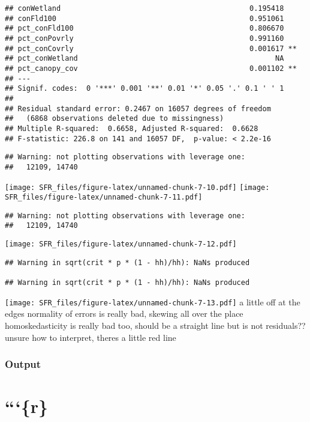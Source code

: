 \documentclass[]{article}
\begin{document}
\begin{verbatim}
## conWetland                                            0.195418    
## conFld100                                             0.951061    
## pct_conFld100                                         0.806670    
## pct_conPovrly                                         0.991160    
## pct_conCovrly                                         0.001617 ** 
## pct_conWetland                                              NA    
## pct_canopy_cov                                        0.001102 ** 
## ---
## Signif. codes:  0 '***' 0.001 '**' 0.01 '*' 0.05 '.' 0.1 ' ' 1
## 
## Residual standard error: 0.2467 on 16057 degrees of freedom
##   (6868 observations deleted due to missingness)
## Multiple R-squared:  0.6658, Adjusted R-squared:  0.6628 
## F-statistic: 226.8 on 141 and 16057 DF,  p-value: < 2.2e-16
\end{verbatim}

\begin{verbatim}
## Warning: not plotting observations with leverage one:
##   12109, 14740
\end{verbatim}

\texttt{[image: SFR\_files/figure-latex/unnamed-chunk-7-10.pdf]}
\texttt{[image: SFR\_files/figure-latex/unnamed-chunk-7-11.pdf]}

\begin{verbatim}
## Warning: not plotting observations with leverage one:
##   12109, 14740
\end{verbatim}

\texttt{[image: SFR\_files/figure-latex/unnamed-chunk-7-12.pdf]}

\begin{verbatim}
## Warning in sqrt(crit * p * (1 - hh)/hh): NaNs produced

## Warning in sqrt(crit * p * (1 - hh)/hh): NaNs produced
\end{verbatim}

\texttt{[image: SFR\_files/figure-latex/unnamed-chunk-7-13.pdf]} a little
off at the edges normality of errors is really bad, skewing all over the
place homoskedasticity is really bad too, should be a straight line but
is not residuals?? unsure how to interpret, theres a little red line

\hypertarget{output}{%
\subsubsection{Output}\label{output}}

\hypertarget{r}{%
\section{```\{r\}}\label{r}}
\end{document}
